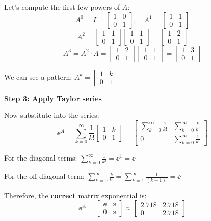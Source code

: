 \documentclass[11pt,a4paper]{article}
\begin{document}
Let's compute the first few powers of $A$:
\[
A^0 = I = \begin{bmatrix} 1 & 0 \\ 0 & 1 \end{bmatrix}, \quad
A^1 = \begin{bmatrix} 1 & 1 \\ 0 & 1 \end{bmatrix}
\]
\[
A^2 = \begin{bmatrix} 1 & 1 \\ 0 & 1 \end{bmatrix}\begin{bmatrix} 1 & 1 \\ 0 & 1 \end{bmatrix} = \begin{bmatrix} 1 & 2 \\ 0 & 1 \end{bmatrix}
\]
\[
A^3 = A^2 \cdot A = \begin{bmatrix} 1 & 2 \\ 0 & 1 \end{bmatrix}\begin{bmatrix} 1 & 1 \\ 0 & 1 \end{bmatrix} = \begin{bmatrix} 1 & 3 \\ 0 & 1 \end{bmatrix}
\]

We can see a pattern: $A^k = \begin{bmatrix} 1 & k \\ 0 & 1 \end{bmatrix}$

\textbf{Step 3: Apply Taylor series}

Now substitute into the series:
\[
\ee^A = \sum_{k=0}^{\infty} \frac{1}{k!}\begin{bmatrix} 1 & k \\ 0 & 1 \end{bmatrix} = \begin{bmatrix} \sum_{k=0}^{\infty} \frac{1}{k!} & \sum_{k=0}^{\infty} \frac{k}{k!} \\ 0 & \sum_{k=0}^{\infty} \frac{1}{k!} \end{bmatrix}
\]

For the diagonal terms: $\sum_{k=0}^{\infty} \frac{1}{k!} = \ee^1 = \ee$

For the off-diagonal term: $\sum_{k=0}^{\infty} \frac{k}{k!} = \sum_{k=1}^{\infty} \frac{1}{(k-1)!} = \ee$

Therefore, the \textbf{correct} matrix exponential is:
\[
\ee^A = \begin{bmatrix} \ee & \ee \\ 0 & \ee \end{bmatrix} \approx \begin{bmatrix} 2.718 & 2.718 \\ 0 & 2.718 \end{bmatrix}
\]
\end{document}
